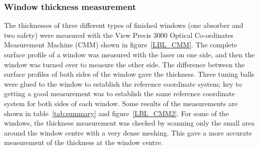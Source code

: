 \subsubsection{Window thickness measurement}

The thicknesses of three different types of finished windows
(one absorber and two safety) were measured
with the View Precis 3000 Optical Co-ordinates Measurement Machine
(CMM) shown in figure~\ref{LBL_CMM}.
The complete surface profile of a window was measured with the laser
on one side, and then the window was turned over to measure the other
side.  
The difference between the surface profiles of both sides of the
window gave the thickness.  
Three tuning balls were glued to the window to establish the reference
coordinate system; key to getting a good measurement was to establish
the same reference coordinate system for both sides of each window.
Some results of the measurements are
shown in table~\ref{tab:summary} and figure~\ref{LBL_CMM2}.
For some of the windows, the thickness measurement was checked by
scanning only the small area around the window centre with a very
dense meshing. 
This gave a more accurate measurement of the thickness at the window
centre.

